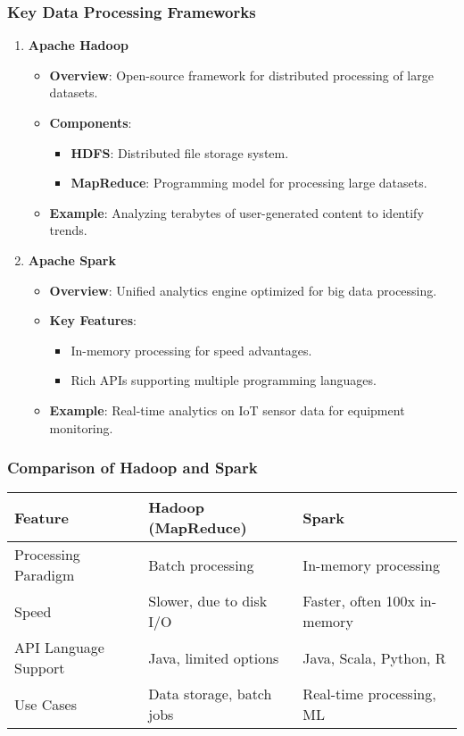 \documentclass{beamer}
\begin{document}
\begin{frame}
    \frametitle{Key Data Processing Frameworks}
    \begin{enumerate}
        \item \textbf{Apache Hadoop}
        \begin{itemize}
            \item \textbf{Overview}: Open-source framework for distributed processing of large datasets.
            \item \textbf{Components}:
            \begin{itemize}
                \item \textbf{HDFS}: Distributed file storage system.
                \item \textbf{MapReduce}: Programming model for processing large datasets.
            \end{itemize}
            \item \textbf{Example}: Analyzing terabytes of user-generated content to identify trends.
        \end{itemize}
        
        \item \textbf{Apache Spark}
        \begin{itemize}
            \item \textbf{Overview}: Unified analytics engine optimized for big data processing.
            \item \textbf{Key Features}:
            \begin{itemize}
                \item In-memory processing for speed advantages.
                \item Rich APIs supporting multiple programming languages.
            \end{itemize}
            \item \textbf{Example}: Real-time analytics on IoT sensor data for equipment monitoring.
        \end{itemize}
    \end{enumerate}
\end{frame}

\begin{frame}
    \frametitle{Comparison of Hadoop and Spark}
    \begin{center}
    \begin{tabular}{|l|l|l|}
        \hline
        \textbf{Feature} & \textbf{Hadoop (MapReduce)} & \textbf{Spark} \\
        \hline
        Processing Paradigm & Batch processing & In-memory processing \\
        \hline
        Speed & Slower, due to disk I/O & Faster, often 100x in-memory \\
        \hline
        API Language Support & Java, limited options & Java, Scala, Python, R \\
        \hline
        Use Cases & Data storage, batch jobs & Real-time processing, ML \\
        \hline
    \end{tabular}
    \end{center}
\end{frame}
\end{document}

